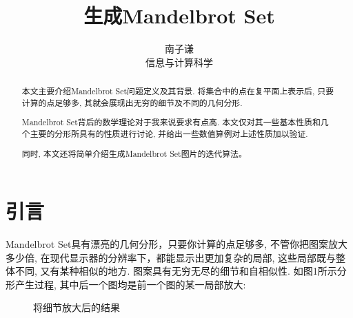 \documentclass{ctexart}
\title{生成Mandelbrot Set}
\author{南子谦 \\ 信息与计算科学\quad 3210104676}
\begin{document}
\maketitle

\begin{abstract}
本文主要介绍Mandelbrot Set问题定义及其背景. 将集合中的点在复平面上表示后, 只要计算的点足够多, 其就会展现出无穷的细节及不同的几何分形. 
\par Mandelbrot Set背后的数学理论对于我来说要求有点高. 本文仅对其一些基本性质和几个主要的分形所具有的性质进行讨论, 并给出一些数值算例对上述性质加以验证.
\par 同时, 本文还将简单介绍生成Mandelbrot Set图片的迭代算法。
\end{abstract}

\section{引言}
Mandelbrot Set具有漂亮的几何分形，只要你计算的点足够多, 不管你把图案放大多少倍, 在现代显示器的分辨率下，都能显示出更加复杂的局部, 这些局部既与整体不同, 又有某种相似的地方. 图案具有无穷无尽的细节和自相似性. 如图1所示分形产生过程, 其中后一个图均是前一个图的某一局部放大: 
\begin{figure}[!ht]
	\centering
	\caption{将细节放大后的结果}
\end{figure}
\end{document}
